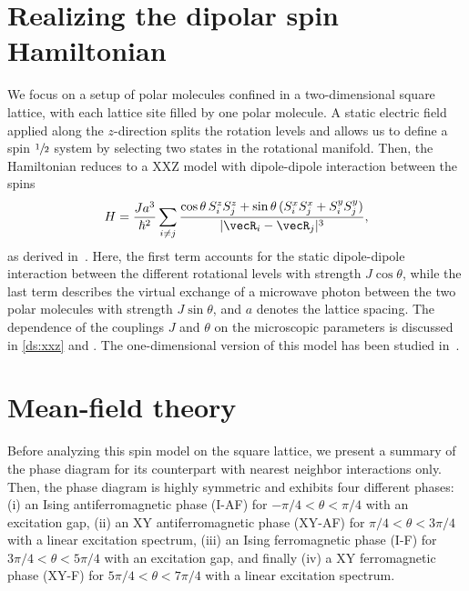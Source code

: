 \section{Realizing the dipolar spin Hamiltonian}
We focus on a setup of polar molecules confined in a two-dimensional square lattice,
with each lattice site filled by one polar molecule. A static electric field applied along
the $z$-direction splits the rotation levels and allows us to define a spin $\sfrac{1}{2}$ system by selecting
two states in the rotational manifold.
Then, the Hamiltonian reduces to a XXZ model with dipole-dipole interaction between the spins \cite{Gorshkov2011,Muller2009}
\begin{align}
H = \frac{J a^3}{\hbar^2} \sum_{i \neq j} \frac{\cos \theta \,
S^{z}_{i}S^{z}_{j}+ \sin \theta
\, ( S^{x}_{i} S^{x}_{j} + S^{y}_{i} S^{y}_{j} ) }{|\vecR_{i} - \vecR_{j}|^3},
\end{align}
%
as derived in~. Here, the first term accounts for the static dipole-dipole
interaction between the different rotational levels with strength $J \cos \theta$, while the last term
describes the virtual exchange of a microwave photon between the two polar molecules with
strength $J \sin \theta$, and $a$ denotes the lattice spacing.
The dependence of the couplings $J$ and $\theta$ on the microscopic
parameters is discussed in \cref{ds:xxz} and . The one-dimensional version of this model has been studied in~\cite{Hauke2010}.

\section{Mean-field theory}

Before analyzing this spin model on the square lattice, we present a
summary of the phase diagram
for its counterpart with nearest neighbor interactions only.
Then, the phase diagram is highly symmetric and
exhibits four different phases: (i) an Ising
antiferromagnetic phase (I-AF) for $-\pi/4 < \theta < \pi/4$ with an
excitation gap, (ii) an XY antiferromagnetic phase (XY-AF) for $\pi/4 < \theta
< 3\pi/4$ with a linear excitation spectrum, (iii) an Ising ferromagnetic phase
(I-F) for $3 \pi/4 < \theta < 5\pi/4$ with an excitation gap, and finally (iv) a
XY ferromagnetic phase (XY-F) for $5 \pi/4 < \theta < 7\pi/4$ with a linear
excitation spectrum.

